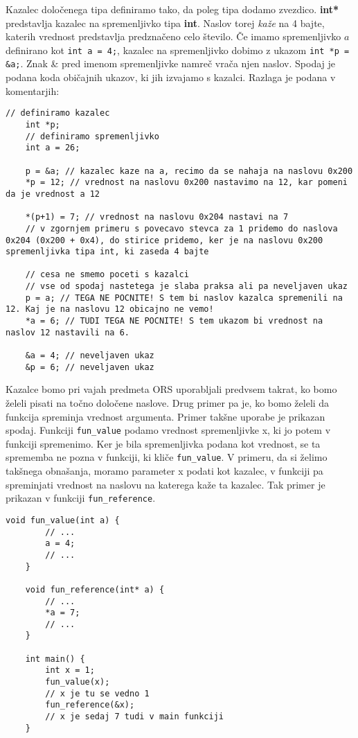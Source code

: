 \documentclass[12pt,letterpaper]{article}
\begin{document}
Kazalec določenega tipa definiramo tako, da poleg tipa dodamo zvezdico. \textbf{int*} predstavlja kazalec na spremenljivko tipa \textbf{int}. Naslov torej \textit{kaže} na 4 bajte, katerih vrednost predstavlja predznačeno celo število. Če imamo spremenljivko $a$ definirano kot \texttt{int a = 4;}, kazalec na spremenljivko dobimo z ukazom \texttt{int *p = \&a;}. Znak \& pred imenom spremenljivke namreč vrača njen naslov. Spodaj je podana koda običajnih ukazov, ki jih izvajamo s kazalci. Razlaga je podana v komentarjih:

\begin{center}
\begin{lstlisting}[style=CStyle]
    // definiramo kazalec
    int *p;
    // definiramo spremenljivko 
    int a = 26;
    
    p = &a; // kazalec kaze na a, recimo da se nahaja na naslovu 0x200
    *p = 12; // vrednost na naslovu 0x200 nastavimo na 12, kar pomeni da je vrednost a 12
    
    *(p+1) = 7; // vrednost na naslovu 0x204 nastavi na 7   
    // v zgornjem primeru s povecavo stevca za 1 pridemo do naslova 0x204 (0x200 + 0x4), do stirice pridemo, ker je na naslovu 0x200 spremenljivka tipa int, ki zaseda 4 bajte
    
    // cesa ne smemo poceti s kazalci
    // vse od spodaj nastetega je slaba praksa ali pa neveljaven ukaz
    p = a; // TEGA NE POCNITE! S tem bi naslov kazalca spremenili na 12. Kaj je na naslovu 12 obicajno ne vemo!
    *a = 6; // TUDI TEGA NE POCNITE! S tem ukazom bi vrednost na naslov 12 nastavili na 6.
    
    &a = 4; // neveljaven ukaz
    &p = 6; // neveljaven ukaz
\end{lstlisting}
\end{center}

Kazalce bomo pri vajah predmeta ORS uporabljali predvsem takrat, ko bomo želeli pisati na točno določene naslove. Drug primer pa je, ko bomo želeli da funkcija spreminja vrednost argumenta. Primer takšne uporabe je prikazan spodaj. Funkciji \texttt{fun\_value} podamo vrednost spremenljivke x, ki jo potem v funkciji spremenimo. Ker je bila spremenljivka podana kot vrednost, se ta sprememba ne pozna v funkciji, ki kliče \texttt{fun\_value}. V primeru, da si želimo takšnega obnašanja, moramo parameter x podati kot kazalec, v funkciji pa spreminjati vrednost na naslovu na katerega kaže ta kazalec. Tak primer je prikazan v funkciji \texttt{fun\_reference}.

\begin{center}
\begin{lstlisting}[style=CStyle]
    void fun_value(int a) {
        // ...
        a = 4;
        // ...
    }
    
    void fun_reference(int* a) {
        // ...
        *a = 7;
        // ...
    }
    
    int main() {
        int x = 1;
        fun_value(x);
        // x je tu se vedno 1
        fun_reference(&x);
        // x je sedaj 7 tudi v main funkciji
    }
\end{lstlisting}
\end{center}
\end{document}
